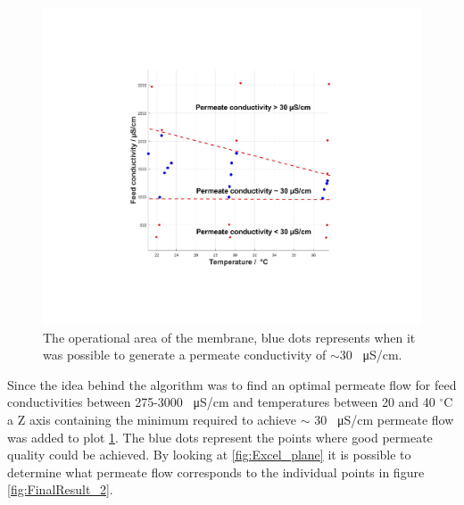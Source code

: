 \begin{figure}[H]
    \centering
    \includegraphics[width=1.1\textwidth]{FinalResult_1}
    \caption{The operational area of the membrane, blue dots represents when it was possible to generate a permeate conductivity of $\sim$30 \SI{}{\micro\siemens}/cm.}
    \label{fig:FinalResult_1}
\end{figure}

\newpage

Since the idea behind the algorithm was to find an optimal permeate flow for feed conductivities between 275-3000 \SI{}{\micro\siemens}/cm and temperatures between 20 and 40  $^{\circ}$C a Z axis containing the minimum required to achieve $\sim$ 30 \SI{}{\micro\siemens}/cm permeate flow was added to plot \ref{fig:FinalResult_1}. The blue dots represent the points where good permeate quality could be achieved. By looking at  \ref{fig:Excel_plane} it is possible to determine what permeate flow corresponds to the individual points in figure \ref{fig:FinalResult_2}.

